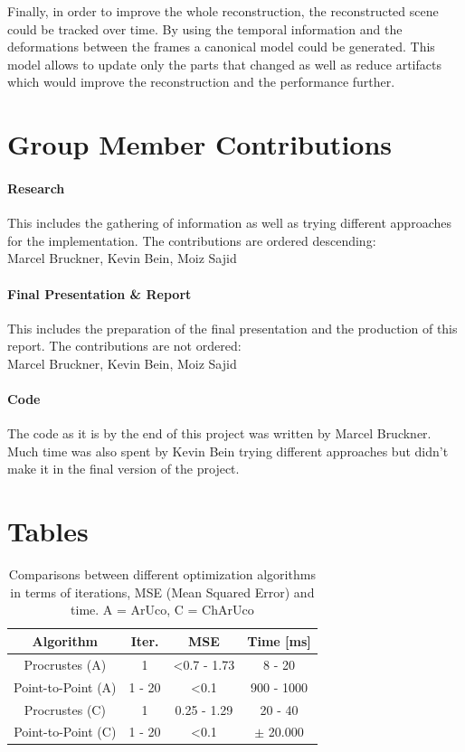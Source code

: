 \documentclass[10pt,twocolumn,letterpaper]{article}
\begin{document}
Finally, in order to improve the whole reconstruction, the reconstructed scene could be tracked over time. By using the temporal information and the deformations between the frames a canonical model could be generated. This model allows to update only the parts that changed as well as reduce artifacts which would improve the reconstruction and the performance further.

\section{Group Member Contributions}
\paragraph{Research}
This includes the gathering of information as well as trying different approaches for the implementation. The contributions are ordered descending:\\
Marcel Bruckner, Kevin Bein, Moiz Sajid

\paragraph{Final Presentation \& Report}
This includes the preparation of the final presentation and the production of this report. The contributions are not ordered:\\
Marcel Bruckner, Kevin Bein, Moiz Sajid

\paragraph{Code}
The code as it is by the end of this project was written by Marcel Bruckner. Much time was also spent by Kevin Bein trying different approaches but didn't make it in the final version of the project. 

\newpage
\section{Tables}
\begin{table}[h!]
  \begin{center}
    \begin{tabular}{c|c|c|c}
      \textbf{Algorithm} & \textbf{Iter.} & \textbf{MSE} & \textbf{Time [ms]}\\
      \hline
      Procrustes (A)  & 1  & \textless 0.7 - 1.73 & 8 - 20\\
      Point-to-Point (A) & 1 - 20  & \textless 0.1 & 900 - 1000\\
      Procrustes (C) & 1  & 0.25 - 1.29 & 20 - 40\\
      Point-to-Point (C) & 1 - 20  & \textless 0.1 & $\pm$ 20.000\\
    \end{tabular}
     \caption{Comparisons between different optimization algorithms in terms of iterations, MSE (Mean Squared Error) and time. A = ArUco, C = ChArUco}
     \label{tab:camera-calibration}
  \end{center}
\end{table}
\end{document}
